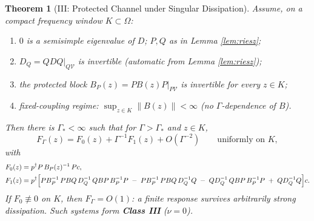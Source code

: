 \documentclass[11pt]{article}
\newtheorem{theorem}{Theorem}
\begin{document}
\begin{theorem}[III: Protected Channel under Singular Dissipation]
\label{thm:III}
Assume, on a compact frequency window $K\subset\Omega$:
\begin{enumerate}[label=(H\arabic*),nosep]
\item $0$ is a semisimple eigenvalue of $D$; $P,Q$ as in Lemma
      \ref{lem:riesz};
\item $D_Q=QDQ|_{Q\mathcal V}$ is invertible (automatic from Lemma
      \ref{lem:riesz});
\item the \emph{protected block} $B_P(z)=PB(z)P|_{P\mathcal V}$ is invertible
      for every $z\in K$;
\item fixed-coupling regime: $\sup_{z\in K}\|B(z)\|<\infty$
      (no $\Gamma$-dependence of $B$).
\end{enumerate}
Then there is $\Gamma_*<\infty$ such that for $\Gamma>\Gamma_*$ and $z\in K$,
\[
F_\Gamma(z)=F_0(z)+\Gamma^{-1}F_1(z)+O(\Gamma^{-2})
\qquad\text{uniformly on }K,
\]
with
\begin{align}
F_0(z)&=p^\dagger P\,B_P(z)^{-1}\,Pc ,
\label{eq:F0}\\
F_1(z)&=p^\dagger\Bigl[
 P B_P^{-1}\,PBQ\,D_Q^{-1}\,QBP\,B_P^{-1}P
 \;-\;PB_P^{-1}\,PBQ\,D_Q^{-1}Q
 \;-\;QD_Q^{-1}\,QBP\,B_P^{-1}P
 \;+\;QD_Q^{-1}Q
\Bigr]c .
\label{eq:F1}
\end{align}
If $F_0\not\equiv0$ on $K$, then $F_\Gamma=O(1)$: a finite response survives
arbitrarily strong dissipation. Such systems form \textbf{Class III}
($\nu=0$).
\end{theorem}
\end{document}
